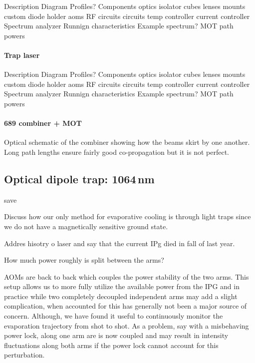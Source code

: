 Description
Diagram
	Profiles?
Components
	optics
		isolator
		cubes
		lenses
	mounts
		custom diode holder
	aoms
		RF circuits
	circuits
		temp controller
		current controller
	Spectrum analyzer
Runnign characteristics
	Example spectrum?
	MOT path powers

\paragraph{Trap laser}

Description
Diagram
	Profiles?
Components
	optics
		isolator
		cubes
		lenses
	mounts
		custom diode holder
	aoms
		RF circuits
	circuits
		temp controller
		current controller
	Spectrum analyzer
Runnign characteristics
	Example spectrum?
	MOT path powers
	
\paragraph{689 combiner + MOT}
Optical schematic of the combiner showing how the beams skirt by one another.
Long path lengths ensure fairly good co-propagation but it is not perfect.



\subsection{Optical dipole trap: 1064\,nm} \label{ssec:1064sys}

save

Discuss how our only method for evaporative cooling is through light traps since we do not have a magnetically sensitive ground state.

Addres hisotry o laser and say that the current IPg died in fall of last year. 

How much power roughly is split between the arms?

AOMs are back to back which couples the power stability of the two arms. 
This setup allows us to more fully utilize the available power from the IPG and in practice while two completely decoupled independent arms may add a slight complication, when accounted for this has generally not been a major source of concern. 
Although, we have found it useful to continuously monitor the evaporation trajectory from shot to shot. 
As a problem, say with a misbehaving power lock, along one arm are is now coupled and may result in intensity fluctuations along both arms if the power lock cannot account for this perturbation.

